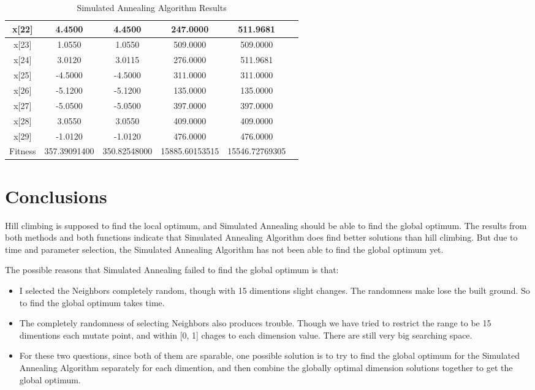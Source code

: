 \documentclass{article}
\begin{document}
\begin{CJK}{UTF8}{gbsn}
\begin{table}[!hbp]
\begin{tabular}{|c|c|c|c|c|c|}
\hline
x[22]	&	 4.4500	&	 4.4500	&	 247.0000	&	 511.9681	\\
\hline
x[23]	&	 1.0550	&	 1.0550	&	 509.0000	&	 509.0000	\\
\hline
x[24]	&	 3.0120	&	 3.0115	&	 276.0000	&	 511.9681	\\
\hline
x[25]	&	-4.5000	&	-4.5000	&	 311.0000	&	 311.0000	\\
\hline
x[26]	&	-5.1200	&	-5.1200	&	 135.0000	&	 135.0000	\\
\hline
x[27]	&	-5.0500	&	-5.0500	&	 397.0000	&	 397.0000	\\
\hline
x[28]	&	 3.0550	&	 3.0550	&	 409.0000	&	 409.0000	\\
\hline
x[29]	&	-1.0120	&	-1.0120	&	 476.0000	&	 476.0000	\\
\hline
\hline
Fitness &  357.39091400 &  350.82548000 &  15885.60153515        & 15546.72769305        \\
\hline
\hline
\end{tabular}
\caption{Simulated Annealing Algorithm Results} 
\end{table}


\section{Conclusions}
Hill climbing is supposed to find the local optimum, and Simulated Annealing should be able to find the global optimum. The results from both methods and both functions indicate that Simulated Annealing Algorithm does find better solutions than hill climbing. But due to time and parameter selection, the Simulated Annealing Algorithm has not been able to find the global optimum yet. 

The possible reasons that Simulated Annealing failed to find the global optimum is that: 
\begin{itemize}
\itemsep=-3pt
\item I selected the Neighbors completely random, though with 15 dimentions slight changes. The randomness make lose the built ground. So to find the global optimum takes time. 

\item The completely randomness of selecting Neighbors also produces trouble. Though we have tried to restrict the range to be 15 dimentions each mutate point, and within [0, 1] chages to each dimension value. There are still very big searching space. 

\item For these two questions, since both of them are sparable, one possible solution is to try to find the global optimum for the Simulated Annealing Algorithm separately for each dimention, and then combine the globally optimal dimension solutions together to get the global optimum. 
\end{itemize}

\end{CJK}
\end{document}
